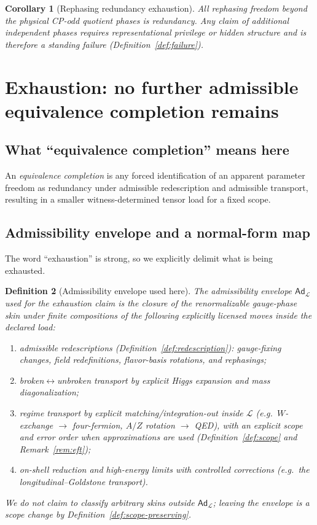 \documentclass[11pt]{article}
\newtheorem{definition}{Definition}[section]
\newtheorem{corollary}[definition]{Corollary}
\theoremstyle{remark}
\newcommand{\Load}{\mathcal{L}}
\newcommand{\Ad}{\ensuremath{\mathsf{Ad}}}
\begin{document}
\begin{corollary}[Rephasing redundancy exhaustion]\label{cor:rephasing}
All rephasing freedom beyond the physical CP-odd quotient phases is redundancy. Any claim of additional
independent phases requires representational privilege or hidden structure and is therefore a standing
failure (Definition~\ref{def:failure}).
\end{corollary}

\section{Exhaustion: no further admissible equivalence completion remains}

\subsection{What ``equivalence completion'' means here}
An \emph{equivalence completion} is any forced identification of an apparent parameter freedom as redundancy
under admissible redescription and admissible transport, resulting in a smaller witness-determined tensor
load for a fixed scope.

\subsection{Admissibility envelope and a normal-form map}\label{sec:envelope-nf}
The word ``exhaustion'' is strong, so we explicitly delimit what is being exhausted.

\begin{definition}[Admissibility envelope used here]\label{def:envelope}
The \emph{admissibility envelope} $\Ad_{\Load}$ used for the exhaustion claim is the closure of the
renormalizable gauge-phase skin under finite compositions of the following \emph{explicitly licensed}
moves inside the declared load:
\begin{enumerate}[label=(\roman*),leftmargin=2.2em]
\item admissible redescriptions (Definition~\ref{def:redescription}): gauge-fixing changes, field
redefinitions, flavor-basis rotations, and rephasings;
\item broken$\leftrightarrow$unbroken transport by explicit Higgs expansion and mass diagonalization;
\item regime transport by explicit matching/integration-out inside $\Load$ (e.g.\ $W$-exchange $\to$
four-fermion, $A/Z$ rotation $\to$ QED), with an explicit scope and error order when approximations are used
(Definition~\ref{def:scope} and Remark~\ref{rem:eft});
\item on-shell reduction and high-energy limits with controlled corrections (e.g.\ the longitudinal--Goldstone
transport).
\end{enumerate}
We do \emph{not} claim to classify arbitrary skins outside $\Ad_{\Load}$; leaving the envelope is a scope
change by Definition~\ref{def:scope-preserving}.
\end{definition}
\end{document}
